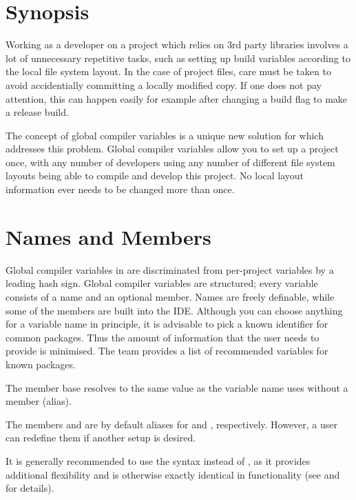 \section{Synopsis}

Working as a developer on a project which relies on 3rd party libraries involves a lot of unnecessary repetitive tasks, such as setting up build variables according to the local file system layout. In the case of project files, care must be taken to avoid accidentially committing a locally modified copy. If one does not pay attention, this can happen easily for example after changing a build flag to make a release build.

The concept of global compiler variables is a unique new solution for \codeblocks which addresses this problem. Global compiler variables allow you to set up a project once, with any number of developers using any number of different file system layouts being able to compile and develop this project. No local layout information ever needs to be changed more than once.

\section{Names and Members}

Global compiler variables in \codeblocks are discriminated from per-project variables by a leading hash sign. Global compiler variables are structured; every variable consists of a name and an optional member. Names are freely definable, while some of the members are built into the IDE. Although you can choose anything for a variable name in principle, it is advisable to pick a known identifier for common packages. Thus the amount of information that the user needs to provide is minimised. The \codeblocks team provides a list of recommended variables for known packages.

The member base resolves to the same value as the variable name uses without a member (alias).

The members  and  are by default aliases for  and , respectively. However, a user can redefine them if another setup is desired.

It is generally recommended to use the syntax  instead of , as it provides additional flexibility and is otherwise exactly identical in functionality (see  and  for details).

